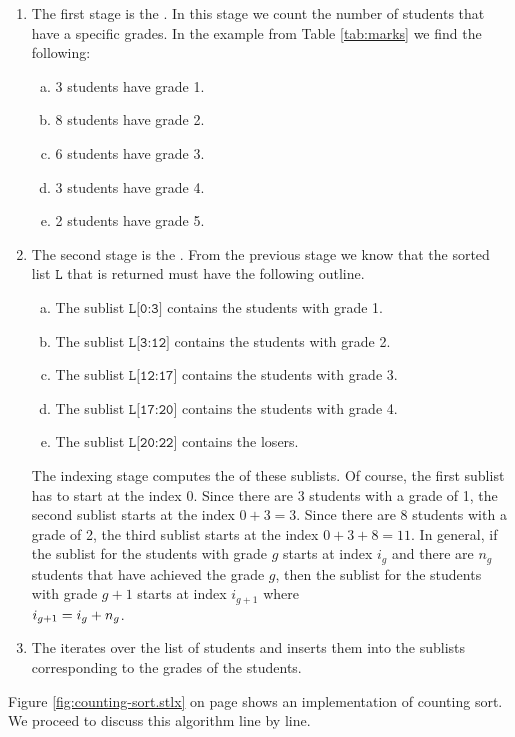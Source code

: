 \begin{enumerate}
\item The first stage is the .  In this stage we count the number of students
      that have a specific grades.  In the example from Table \ref{tab:marks} we find the following:
      \begin{enumerate}[(a)]
      \item 3 students have grade 1.
      \item 8 students have grade 2.
      \item 6 students have grade 3.
      \item 3 students have grade 4.
      \item 2 students have grade 5.
      \end{enumerate}
\item The second stage is the .   From the previous stage we know that the sorted
      list $\texttt{L}$ that is returned must have the following outline.
      \begin{enumerate}[(a)]
      \item The sublist $\texttt{L[0:3]}$ contains the students with grade 1.
      \item The sublist $\texttt{L[3:12]}$ contains the students with grade 2.
      \item The sublist $\texttt{L[12:17]}$ contains the students with grade 3.
      \item The sublist $\texttt{L[17:20]}$ contains the students with grade 4.
      \item The sublist $\texttt{L[20:22]}$ contains the losers.
      \end{enumerate}
      The indexing stage computes the  of these sublists.
      Of course,  the first sublist has to start at the index $0$.  Since there are 3 students with a grade of 1,
      the second sublist starts at the index $0 + 3 = 3$.  Since there are 8 students with a grade of 2, the third
      sublist starts at the index $0 + 3 + 8 = 11$.  In general, if the sublist for the students with grade $g$
      starts at index $i_g$ and there are $n_g$ students that have achieved the grade $g$, then the sublist for the
      students with grade $g+1$ starts at index $i_{g+1}$ where
      \\[0.2cm]
      \hspace*{1.3cm}
      $\displaystyle i_{g+1} = i_g + n_g$.
\item The  iterates over the list of students and inserts them into the sublists
      corresponding to the grades of the students.
\end{enumerate}
Figure \ref{fig:counting-sort.stlx} on page \pageref{fig:counting-sort.stlx} shows an implementation of
counting sort.  We proceed to discuss this algorithm line by line.

